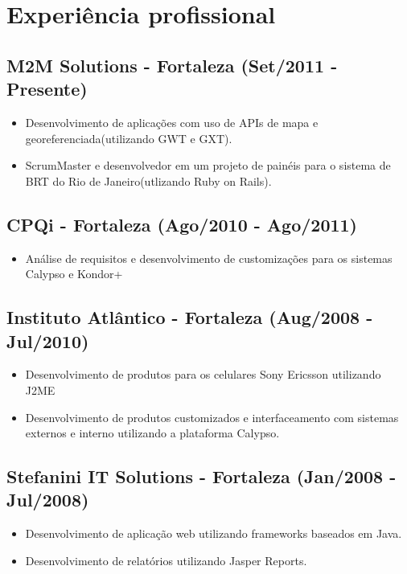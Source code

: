 \documentclass[letterpaper]{article}
\begin{document}
\section*{Experiência profissional}
{\addtolength{\leftskip}{3.5mm}\subsection*{\bfseries{M2M Solutions - Fortaleza (Set/2011 - Presente)}}  
\begin{itemize}
\item Desenvolvimento de aplicações com uso de APIs de mapa e georeferenciada(utilizando GWT e GXT).
\item ScrumMaster e desenvolvedor em um projeto de painéis para o sistema de BRT do Rio de Janeiro(utlizando Ruby on Rails).
\end{itemize}

\subsection*{\bfseries{CPQi - Fortaleza (Ago/2010 - Ago/2011)}} 
\begin{itemize}
\item Análise de requisitos e desenvolvimento de customizações para os sistemas Calypso e Kondor+
\end{itemize}

\subsection*{\bfseries{Instituto Atlântico - Fortaleza (Aug/2008 - Jul/2010)}}
\begin{itemize}
\item Desenvolvimento de produtos para os celulares Sony Ericsson utilizando J2ME
\item Desenvolvimento de produtos customizados e interfaceamento com sistemas externos e interno utilizando a plataforma Calypso.
\end{itemize}

\subsection*{\bfseries{Stefanini IT Solutions - Fortaleza (Jan/2008 - Jul/2008)}}
\begin{itemize}
\item Desenvolvimento de aplicação web utilizando frameworks baseados em Java.
\item Desenvolvimento de relatórios utilizando Jasper Reports.
\end{itemize}

}
\end{document}
